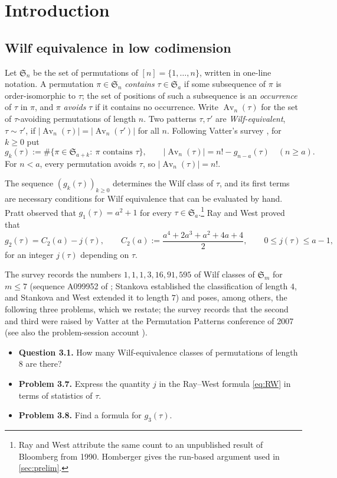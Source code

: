 \documentclass[11pt,reqno]{amsart}
\theoremstyle{plain}
\theoremstyle{definition}
\theoremstyle{remark}
\newcommand{\Av}{\operatorname{Av}}
\newcommand{\Sym}{\mathfrak{S}}
\begin{document}
\section{Introduction}\label{sec:intro}

\subsection{Wilf equivalence in low codimension}

Let $\Sym_n$ be the set of permutations of $[n]=\{1,\dots,n\}$, written in one-line notation. A permutation $\pi\in\Sym_n$ \emph{contains} $\tau\in\Sym_a$ if some subsequence of $\pi$ is order-isomorphic to $\tau$; the set of positions of such a subsequence is an \emph{occurrence} of $\tau$ in $\pi$, and $\pi$ \emph{avoids} $\tau$ if it contains no occurrence. Write $\Av_n(\tau)$ for the set of $\tau$-avoiding permutations of length $n$. Two patterns $\tau,\tau'$ are \emph{Wilf-equivalent}, $\tau\sim\tau'$, if $|\Av_n(\tau)|=|\Av_n(\tau')|$ for all $n$. Following Vatter's survey \cite{Vatter2026}, for $k\ge0$ put
\begin{equation}\label{eq:gk}
g_k(\tau):=\#\{\pi\in\Sym_{a+k}:\ \pi\text{ contains }\tau\},\qquad |\Av_n(\tau)|=n!-g_{n-a}(\tau)\quad(n\ge a).
\end{equation}
For $n<a$, every permutation avoids $\tau$, so $|\Av_n(\tau)|=n!$.

The sequence $(g_k(\tau))_{k\ge0}$ determines the Wilf class of $\tau$, and its first terms are necessary conditions for Wilf equivalence that can be evaluated by hand. Pratt \cite{Pratt1973} observed that $g_1(\tau)=a^2+1$ for every $\tau\in\Sym_a$.\footnote{Ray and West \cite[p.~57]{RayWest2003} attribute the same count to an unpublished result of Bloomberg from 1990. Homberger \cite{Homberger2012} gives the run-based argument used in \cref{sec:prelim}.} Ray and West \cite{RayWest2003} proved that
\begin{equation}\label{eq:RW}
g_2(\tau)=C_2(a)-j(\tau),\qquad C_2(a):=\frac{a^4+2a^3+a^2+4a+4}{2},\qquad 0\le j(\tau)\le a-1,
\end{equation}
for an integer $j(\tau)$ depending on $\tau$. 

The survey \cite{Vatter2026} records the numbers $1,1,1,3,16,91,595$ of Wilf classes of $\Sym_m$ for $m\le7$ (sequence A099952 of \cite{OEIS}; Stankova \cite{Stankova1994,Stankova1996} established the classification of length $4$, and Stankova and West \cite{StankovaWest2002} extended it to length $7$) and poses, among others, the following three problems, which we restate; the survey records that the second and third were raised by Vatter at the Permutation Patterns conference of 2007 (see also the problem-session account \cite{Vatter2010}).
\begin{itemize}
\item \textbf{Question 3.1.} How many Wilf-equivalence classes of permutations of length $8$ are there?
\item \textbf{Problem 3.7.} Express the quantity $j$ in the Ray--West formula \eqref{eq:RW} in terms of statistics of $\tau$.
\item \textbf{Problem 3.8.} Find a formula for $g_3(\tau)$.
\end{itemize}
\end{document}
